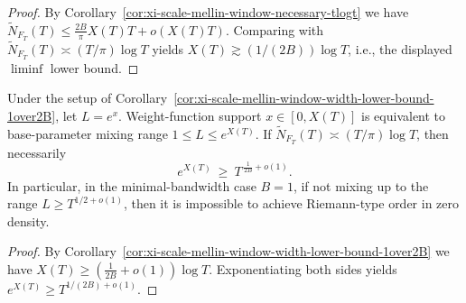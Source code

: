 \begin{proof}
By Corollary~\ref{cor:xi-scale-mellin-window-necessary-tlogt} we have
\(
\widetilde N_{F_T}(T)\le \frac{2B}{\pi}X(T)T+o(X(T)T)
\).
Comparing with \(\widetilde N_{F_T}(T)\asymp (T/\pi)\log T\) yields \(X(T)\gtrsim (1/(2B))\log T\), i.e., the displayed \(\liminf\) lower bound.
\end{proof}

\begin{corollary}\label{cor:xi-scale-mellin-base-range-threshold}
Under the setup of Corollary~\ref{cor:xi-scale-mellin-window-width-lower-bound-1over2B}, let \(L=e^{x}\).
Weight-function support \(x\in[0,X(T)]\) is equivalent to base-parameter mixing range
\(
1\le L\le e^{X(T)}
\).
If \(\widetilde N_{F_T}(T)\asymp (T/\pi)\log T\), then necessarily
\[
e^{X(T)}\ \ge\ T^{\,\frac{1}{2B}+o(1)}.
\]
In particular, in the minimal-bandwidth case \(B=1\), if not mixing up to the range \(L\ge T^{1/2+o(1)}\), then it is impossible to achieve Riemann-type order in zero density.
\end{corollary}

\begin{proof}
By Corollary~\ref{cor:xi-scale-mellin-window-width-lower-bound-1over2B} we have \(X(T)\ge (\frac{1}{2B}+o(1))\log T\).
Exponentiating both sides yields \(e^{X(T)}\ge T^{1/(2B)+o(1)}\).
\end{proof}

